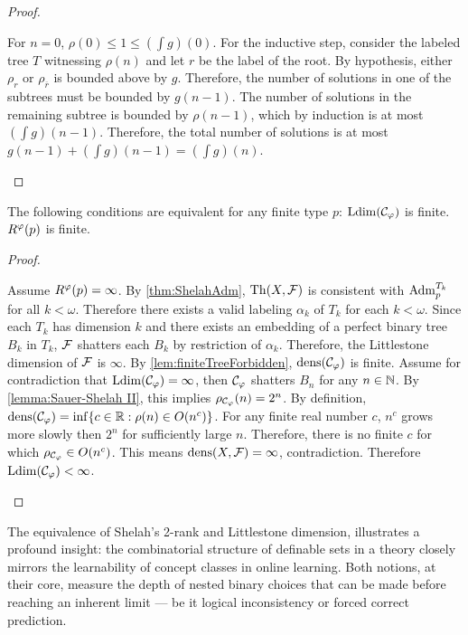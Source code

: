 \begin{proof}
\begin{outline}
            \3 For $n=0$, $\rho(0)\leq 1 \leq (\int g) (0)$.
            \3 For the inductive step, consider the labeled tree $T$ witnessing $\rho(n)$ and let $r$ be the label of the root. By hypothesis, either $\rho_r$ or $\rho_{\overline{r}}$ is bounded above by $g$. 
                \4 Therefore, the number of solutions in one of the subtrees must be bounded by $g(n-1)$.
                \4 The number of solutions in the remaining subtree is bounded by $\rho(n-1)$, which by induction is at most $(\int g)(n-1)$. 
                \4 Therefore, the total number of solutions is at most $g(n-1) + (\int g)(n-1) = (\int g)(n)$.
\end{outline}
\end{proof}

\begin{theorem}
\label{thm:LdimShelahRank}
\begin{outline}
\0 The following conditions are equivalent for any finite type $p$:
    \1[1)] $\operatorname{Ldim}(\mathcal{C}_\varphi)$ is finite.
    \1[2)] $R^\varphi(p)$ is finite.
\end{outline}
\end{theorem}
\begin{proof}
~
\begin{outline}
\1[]
    \2[1)$\implies$2):] Assume $R^\varphi(p) =\infty$. By \cref{thm:ShelahAdm}, $\operatorname{Th}(X,\mathcal{F})$ is consistent with $\operatorname{Adm}^{T_k}_{p}$ for all $k<\omega$. Therefore there exists a valid labeling $\alpha_k$ of $T_k$ for each $k<\omega$. Since each $T_k$ has dimension $k$ and there exists an embedding of a perfect binary tree $B_k$ in $T_k$, $\mathcal{F}$ shatters each $B_k$ by restriction of $\alpha_k$. Therefore, the Littlestone dimension of $\mathcal{F}$ is $\infty$.
    \2[2)$\implies$1):] By \cref{lem:finiteTreeForbidden}, $\operatorname{dens}(\mathcal{C}_\varphi)$ is finite. Assume for contradiction that $\operatorname{Ldim}(\mathcal{C}_\varphi)=\infty$, then $\mathcal{C}_\varphi$ shatters $B_n$ for any $n\in\mathbb{N}$. By \cref{lemma:Sauer-Shelah II}, this implies $\rho_{\mathcal{C}_\varphi}(n)=2^n$. By definition, $\operatorname{dens}(\mathcal{C}_\varphi)=\inf\{c\in\mathbb{R}: \rho(n)\in O(n^c)\}$. For any finite real number $c$, $n^c$ grows more slowly then $2^n$ for sufficiently large $n$. Therefore, there is no finite $c$ for which $\rho_{\mathcal{C}_\varphi}\in O(n^c)$. This means $\operatorname{dens}(X,\mathcal{F})=\infty$, contradiction. Therefore $\operatorname{Ldim}(\mathcal{C}_\varphi)<\infty$.
\end{outline}
\end{proof}

The equivalence of Shelah's 2-rank and Littlestone dimension, illustrates a profound insight: the combinatorial structure of definable sets in a theory closely mirrors the learnability of concept classes in online learning. Both notions, at their core, measure the depth of nested binary choices that can be made before reaching an inherent limit --- be it logical inconsistency or forced correct prediction.

